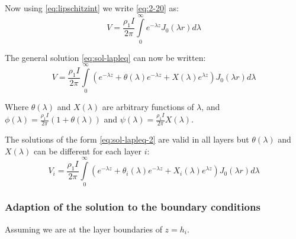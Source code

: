 Now using \eqref{eq:lipschitzint} we write \eqref{eq:2-20} as:
\begin{equation}
V=\frac{\rho_1 I}{2\pi}\int\limits_{0}^{\infty}e^{-\lambda z}J_0(\lambda r)d\lambda
\end{equation}

The general solution \eqref{eq:sol-lapleq} can now be written:
\begin{equation}
V=\frac{\rho_1 I}{2\pi}\int\limits_{0}^{\infty}\left(e^{-\lambda z}+\theta(\lambda)e^{-\lambda z}+X(\lambda)e^{\lambda z}\right) J_0(\lambda r)d\lambda \label{eq:sol-lapleq-2}
\end{equation}

Where $\theta(\lambda)$ and $X(\lambda)$ are arbitrary functions of $\lambda$, and $\phi(\lambda)=\frac{\rho_1 I}{2\pi}\left(1+\theta(\lambda)\right)$ and $\psi(\lambda)=\frac{\rho_1 I}{2\pi}X(\lambda)$.

The solutions of the form \eqref{eq:sol-lapleq-2} are valid in all layers but $\theta(\lambda)$ and $X(\lambda)$ can be different for each layer $i$:
\begin{equation}
V_i=\frac{\rho_1 I}{2\pi}\int\limits_{0}^{\infty}\left(e^{-\lambda z}+\theta_i(\lambda)e^{-\lambda z}+X_i(\lambda)e^{\lambda z}\right)J_0(\lambda r) d\lambda\label{eq:sol-lapleq-3}
\end{equation}

\subsubsection*{Adaption of the solution to the boundary conditions}

Assuming we are at the layer boundaries of $z=h_i$.


